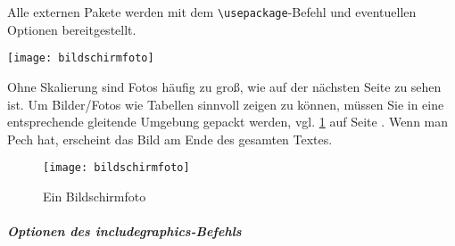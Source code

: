 Alle externen Pakete werden mit dem \lstinline|\usepackage|-Befehl und
eventuellen Optionen bereitgestellt.

\texttt{[image: bildschirmfoto]} %

Ohne Skalierung sind Fotos häufig zu groß, wie auf der nächsten Seite zu
sehen ist. Um Bilder/Fotos wie Tabellen sinnvoll zeigen zu können, müssen
Sie in eine entsprechende gleitende Umgebung gepackt werden,
vgl. \cref{fig:bildschirm} auf Seite \pageref{fig:bildschirm}. Wenn man
Pech hat, erscheint das Bild am Ende des gesamten Textes.
\begin{figure}[htb]
    \centering%
    \texttt{[image: bildschirmfoto]}
    \caption{Ein Bildschirmfoto} %
    \label{fig:bildschirm}
\end{figure}

\subparagraph{Optionen des includegraphics-Befehls}


